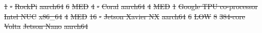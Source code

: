 \documentclass[draft,final]{vutinfth} %
\providecommand{\DIFdeltex}[1]{{\protect\color{red}\sout{#1}}}                      %
\providecommand{\DIFdelFL}[1]{\DIFdel{#1}} %
\providecommand{\DIFdel}[1]{\texorpdfstring{\DIFdeltex{#1}}{}} %
\begin{document}
\DIFdelFL{1                                                             }%
\DIFdelFL{-                       }%
\DIFdelFL{RockPi                                                         }%
\DIFdelFL{aarch64                                                     }%
\DIFdelFL{6                                                            }%
\DIFdelFL{MED                                                         }%
\DIFdelFL{4                                                             }%
\DIFdelFL{-                       }%
\DIFdelFL{Coral                                                          }%
\DIFdelFL{aarch64                                                     }%
\DIFdelFL{4                                                            }%
\DIFdelFL{MED                                                         }%
\DIFdelFL{1                                                             }%
\DIFdelFL{Google TPU co-processor }%
\DIFdelFL{Intel NUC                                                            }%
\DIFdelFL{x86\_64                                                     }%
\DIFdelFL{4                                                            }%
\DIFdelFL{MED                                                         }%
\DIFdelFL{16                                                            }%
\DIFdelFL{-                       }%
\DIFdelFL{Jetson Xavier NX                                                             }%
\DIFdelFL{aarch64                                                     }%
\DIFdelFL{6                                                            }%
\DIFdelFL{LOW                                                         }%
\DIFdelFL{8                                                             }%
\DIFdelFL{384-core Volta          }%
\DIFdelFL{Jetson Nano                                                           }%
\DIFdelFL{aarch64                                                     }%
\end{document}
